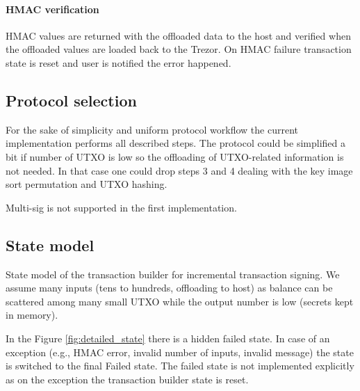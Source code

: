 \documentclass[]{article}
\begin{document}
\paragraph{HMAC verification}
HMAC values are returned with the offloaded data to the host and verified when the offloaded values are loaded back to the Trezor. 
On HMAC failure transaction state is reset and user is notified the error happened.

\subsection{Protocol selection}
For the sake of simplicity and uniform protocol workflow the current implementation performs all described steps.
The protocol could be simplified a bit if number of UTXO is low so the offloading of UTXO-related information is not needed. In that case one could drop steps 3 and 4 dealing with the key image sort permutation and UTXO hashing. 

Multi-sig is not supported in the first implementation.

\subsection{State model}

State model of the transaction builder for incremental transaction signing. We assume many inputs (tens to hundreds, offloading to host) as balance can be scattered among many small UTXO while the output number is low (secrets kept in memory).

In the Figure \ref{fig:detailed_state} there is a hidden failed state. In case of an exception (e.g., HMAC error, invalid number of inputs, invalid message) the state is switched to the final Failed state. The failed state is not implemented explicitly as on the exception the transaction builder state is reset.
\end{document}
